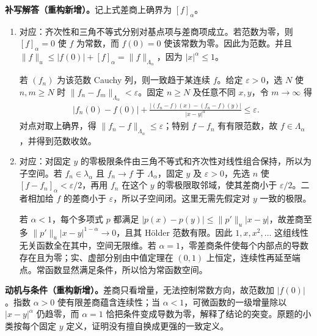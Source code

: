 \documentclass[../../main.tex]{subfiles}
\begin{document}
\begin{solution}
\textbf{补写解答（重构新增）。}记上式差商上确界为 $[f]_\alpha$。
\begin{enumerate}
\item 对应：齐次性和三角不等式分别对基点项与差商项成立。若范数为零，则 $[f]_\alpha=0$ 使 $f$ 为常数，而 $f(0)=0$ 使该常数为零。因此为范数。并且 $\|f\|_u\le|f(0)|+[f]_\alpha=\|f\|_{\Lambda_\alpha}$，因为 $|x|^\alpha\le1$。

若 $(f_n)$ 为该范数 Cauchy 列，则一致趋于某连续 $f$。给定 $\varepsilon>0$，选 $N$ 使 $n,m\ge N$ 时 $\|f_n-f_m\|_{\Lambda_\alpha}<\varepsilon$。固定 $n\ge N$ 及任意不同 $x,y$，令 $m\to\infty$ 得
\begin{align*}
|f_n(0)-f(0)|+\frac{|(f_n-f)(x)-(f_n-f)(y)|}{|x-y|^\alpha}\le\varepsilon.
\end{align*}
对点对取上确界，得 $\|f_n-f\|_{\Lambda_\alpha}\le\varepsilon$；特别 $f-f_n$ 有有限范数，故 $f\in\Lambda_\alpha$，并得到范数收敛。
\item 对应：对固定 $y$ 的零极限条件由三角不等式和齐次性对线性组合保持，所以为子空间。若 $f_n\in\lambda_\alpha$ 且 $f_n\to f$ 于 $\Lambda_\alpha$，固定 $y$ 及 $\varepsilon>0$，先选 $n$ 使 $[f-f_n]_\alpha<\varepsilon/2$，再用 $f_n$ 在这个 $y$ 的零极限取邻域，使其差商小于 $\varepsilon/2$。二者相加给 $f$ 的差商小于 $\varepsilon$，所以子空间闭。这里无需先假定对 $y$ 一致的极限。

若 $\alpha<1$，每个多项式 $p$ 都满足 $|p(x)-p(y)|\le\|p'\|_u|x-y|$，故差商至多 $\|p'\|_u|x-y|^{1-\alpha}\to0$，且其 Hölder 范数有限。因此 $1,x,x^2,\ldots$ 这组线性无关函数全在其中，空间无限维。若 $\alpha=1$，零差商条件使每个内部点的导数存在且为零；实、虚部分别由中值定理在 $(0,1)$ 上恒定，连续性再延至端点。常函数显然满足条件，所以恰为常函数空间。
\end{enumerate}
\end{solution}
\begin{remark}
\textbf{动机与条件（重构新增）。}差商只看增量，无法控制常数方向，故范数加 $|f(0)|$。指数 $\alpha>0$ 使有限差商蕴含连续性；当 $\alpha<1$，可微函数的一级增量除以 $|x-y|^\alpha$ 仍趋零，而 $\alpha=1$ 恰把条件变成导数为零，解释了结论的突变。原题的小类按每个固定 $y$ 定义，证明没有擅自换成更强的一致定义。
\end{remark}
\end{document}
